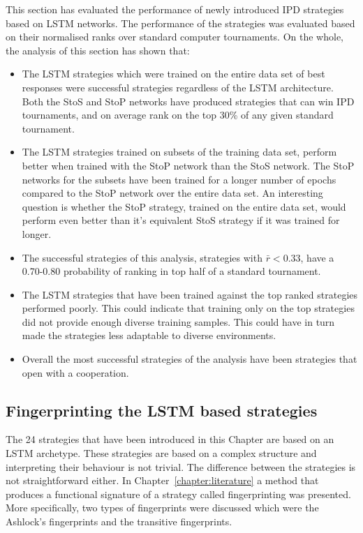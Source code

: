 This section has evaluated the performance of \lstmstrategies newly introduced
IPD strategies based on LSTM networks. The performance of the strategies was
evaluated based on their normalised ranks over \metatournamentslstm standard
computer tournaments. On the whole, the analysis of this section has shown that:

\begin{itemize}
    \item The LSTM strategies which were trained on the entire data set of best
    responses were successful strategies regardless of the LSTM architecture.
    Both the StoS and StoP networks have produced strategies that can win IPD
    tournaments, and on average rank on the top 30\% of any given standard
    tournament.
    \item The LSTM strategies trained on subsets of the training data set, perform
    better when trained with the StoP network than the StoS network. The StoP
    networks for the subsets have been trained for a longer number of epochs
    compared to the StoP network over the entire data set. An interesting
    question is whether the StoP strategy, trained on the entire data set, would
    perform even better than it's equivalent StoS strategy if it was trained for
    longer.
    \item The successful strategies of this analysis, strategies with \(\bar{r}
    <0.33\), have a 0.70-0.80 probability of ranking in top half of a standard
    tournament.
    \item The LSTM strategies that have been trained against the top ranked
    strategies performed poorly. This could indicate that training only
    on the top strategies did not provide enough diverse training samples. This
    could have in turn made the strategies less adaptable to diverse environments.
    \item Overall the most successful strategies of the analysis have been
    strategies that open with a cooperation.
\end{itemize}

\subsection{Fingerprinting the LSTM based strategies}

The 24 strategies that have been introduced in this Chapter are based on an
LSTM archetype. These strategies are based on a complex structure and interpreting
their behaviour is not trivial. The difference between the strategies is not
straightforward either. In Chapter~\ref{chapter:literature} a method that
produces a functional signature of a strategy called fingerprinting was presented.
More specifically, two types of fingerprints were discussed which were the
Ashlock's fingerprints and the transitive fingerprints.


